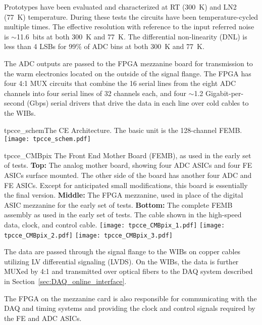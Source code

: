 Prototypes have been evaluated and characterized at RT (300~K) and LN2 (77~K) temperature.
During these tests the circuits have been temperature-cycled multiple times.
The effective resolution with reference to the input referred noise is $\sim$11.6~bits at both 300~K and 77~K.
The differential non-linearity (DNL) is less than 4 LSBs for 99\% of ADC bins at both 300~K and 77~K.

 
 
 The ADC outputs are passed to the FPGA mezzanine board for transmission to the warm electronics
 located on the outside of the signal flange.
The FPGA has four 4:1 MUX circuits that combine the 16 serial lines from the eight ADC
channels into four serial lines of 32 channels each, and 
four $\sim$1.2 Gigabit-per-second (Gbps) serial drivers that drive the data in each
line over cold cables to the WIBs.

\begin{cdrfigure}{tpcce_schem}{The CE Architecture. The basic unit is the 128-channel FEMB.}
\texttt{[image: tpcce\_schem.pdf]}
\end{cdrfigure}

\begin{cdrfigure}{tpcce_CMBpix}
{The Front End Mother Board (FEMB), as used in the early set of tests.
  {\bf Top:} The analog mother board, showing four ADC ASICs and four FE ASICs surface mounted.
  The other side of the board has another four ADC and FE ASICs.
  Except for anticipated small modifications, this board is essentially the final version.
  {\bf Middle:} The FPGA mezzanine, used in place of the digital ASIC mezzanine for the early set of tests.
  {\bf Bottom:} The complete FEMB assembly as used in the early set of tests.
  The cable shown in the high-speed data, clock, and control cable.}
\texttt{[image: tpcce\_CMBpix\_1.pdf]}
\texttt{[image: tpcce\_CMBpix\_2.pdf]}
\texttt{[image: tpcce\_CMBpix\_3.pdf]}
\end{cdrfigure}

The data are passed through the signal flange to the WIBs on copper cables utilizing LV differential signaling (LVDS).
On the WIBs, the data is further MUXed by 4:1 and transmitted over optical
fibers to the DAQ system described in Section~\ref{sec:DAQ_online_interface}.

The FPGA on the mezzanine card is also responsible for communicating with the
DAQ and timing systems and providing the clock and control signals required by the FE and ADC ASICs.

